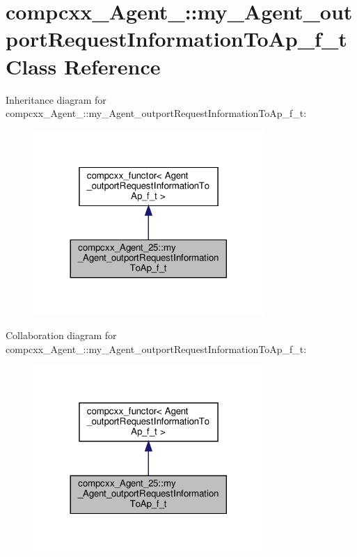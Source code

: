 \hypertarget{classcompcxx__Agent__25_1_1my__Agent__outportRequestInformationToAp__f__t}{}\section{compcxx\+\_\+\+Agent\+\_\+:\+:my\+\_\+\+Agent\+\_\+outport\+Request\+Information\+To\+Ap\+\_\+f\+\_\+t Class Reference}
\label{classcompcxx__Agent__25_1_1my__Agent__outportRequestInformationToAp__f__t}


Inheritance diagram for compcxx\+\_\+\+Agent\+\_\+:\+:my\+\_\+\+Agent\+\_\+outport\+Request\+Information\+To\+Ap\+\_\+f\+\_\+t\+:\nopagebreak
\begin{figure}[H]
\begin{center}
\leavevmode
\includegraphics[width=248pt]{classcompcxx__Agent__25_1_1my__Agent__outportRequestInformationToAp__f__t__inherit__graph}
\end{center}
\end{figure}


Collaboration diagram for compcxx\+\_\+\+Agent\+\_\+:\+:my\+\_\+\+Agent\+\_\+outport\+Request\+Information\+To\+Ap\+\_\+f\+\_\+t\+:\nopagebreak
\begin{figure}[H]
\begin{center}
\leavevmode
\includegraphics[width=248pt]{classcompcxx__Agent__25_1_1my__Agent__outportRequestInformationToAp__f__t__coll__graph}
\end{center}
\end{figure}
